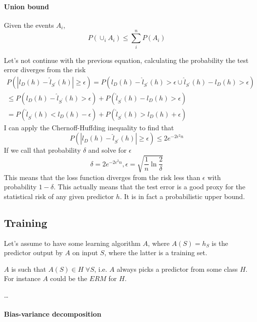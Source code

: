 \paragraph{Union bound}
Given the events $A_i$, $$P(\cup_i A_i) \leq \sum_i^n P(A_i)$$

Let's not continue with the previous equation, calculating the probability the 
test error diverges from the risk
\begin{equation}
    \begin{aligned}
        P(|l_D(h) - \hat{l}_{S^\prime}(h)| \geq \epsilon) 
        = P(l_D(h) - \hat{l}_{S^\prime}(h) > \epsilon \cup
        \hat{l}_{S^\prime}(h) - l_D(h) > \epsilon)\\
        \leq P(l_D(h) - \hat{l}_{S^\prime}(h) > \epsilon) +
        P(\hat{l}_{S^\prime}(h) - l_D(h) > \epsilon)\\
        = P(\hat{l}_{S^\prime}(h) < l_D(h) - \epsilon) +
        P(\hat{l}_{S^\prime}(h) > l_D(h) + \epsilon)
    \end{aligned}
\end{equation}
I can apply the Chernoff-Huffding inequality to find that
 $$P(|l_D(h) - \hat{l}_{S^\prime}(h)| \geq \epsilon) \leq 2e^{-2\epsilon^2n}$$
If we call that probability $\delta$ and solve for $\epsilon$
$$\delta = 2e^{-2\epsilon^2n}, \epsilon = \sqrt{\frac{1}{n}\ln \frac{2}{\delta}}$$
This means that the loss function diverges from the risk less than $\epsilon$ with probability
$1-\delta$.
This actually means that the test error is a good proxy
for the statistical risk of any given predictor $h$. It is in fact a 
probabilistic upper bound.

\subsection{Training}
Let's assume to have some learning algorithm $A$, where
$A(S) = h_S$ is the predictor output by $A$ on input $S$, where the latter 
is a training set.

$A$ is such that $A(S) \in H\;\forall S$, i.e. $A$ always picks a predictor 
from some class $H$. For instance $A$ could be the $\mathit{ERM}$ for $H$.

\dots

\paragraph{Bias-variance decomposition}
